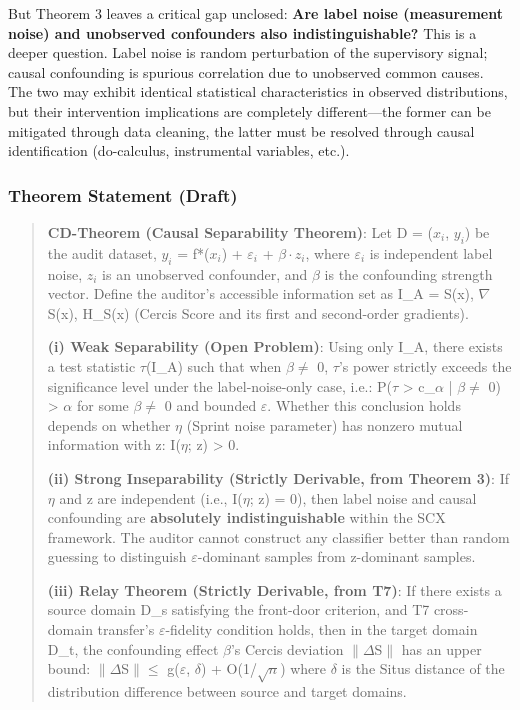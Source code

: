 \documentclass[
  12pt,
]{article}
\begin{document}
But Theorem 3 leaves a critical gap unclosed: \textbf{Are label noise (measurement noise) and unobserved confounders also indistinguishable?} This is a deeper question. Label noise is random perturbation of the supervisory signal; causal confounding is spurious correlation due to unobserved common causes. The two may exhibit identical statistical characteristics in observed distributions, but their intervention implications are completely different---the former can be mitigated through data cleaning, the latter must be resolved through causal identification (do-calculus, instrumental variables, etc.).

\subsubsection{Theorem Statement (Draft)}\label{cd-statement}

\begin{quote}
\textbf{CD-Theorem (Causal Separability Theorem)}: Let D = {($x_i$, $y_i$)} be the audit dataset, $y_i$ = f*($x_i$) + $\varepsilon_i$ + $\beta\cdot z_i$, where $\varepsilon_i$ is independent label noise, $z_i$ is an unobserved confounder, and $\beta$ is the confounding strength vector. Define the auditor's accessible information set as I\_A = {S(x), $\nabla$S(x), H\_S(x)} (Cercis Score and its first and second-order gradients).

\textbf{(i) Weak Separability (Open Problem)}: Using only I\_A, there exists a test statistic $\tau$(I\_A) such that when $\beta \neq$ 0, $\tau$'s power strictly exceeds the significance level under the label-noise-only case, i.e.: P($\tau$ > c\_$\alpha$ | $\beta \neq$ 0) > $\alpha$ for some $\beta \neq$ 0 and bounded $\varepsilon$. Whether this conclusion holds depends on whether $\eta$ (Sprint noise parameter) has nonzero mutual information with z: I($\eta$; z) > 0.

\textbf{(ii) Strong Inseparability (Strictly Derivable, from Theorem 3)}: If $\eta$ and z are independent (i.e., I($\eta$; z) = 0), then label noise and causal confounding are \textbf{absolutely indistinguishable} within the SCX framework. The auditor cannot construct any classifier better than random guessing to distinguish $\varepsilon$-dominant samples from z-dominant samples.

\textbf{(iii) Relay Theorem (Strictly Derivable, from T7)}: If there exists a source domain D\_s satisfying the front-door criterion, and T7 cross-domain transfer's $\varepsilon$-fidelity condition holds, then in the target domain D\_t, the confounding effect $\beta$'s Cercis deviation $\|\Delta$S$\|$ has an upper bound: $\|\Delta$S$\| \leq$ g($\varepsilon$, $\delta$) + O(1/$\sqrt{n}$) where $\delta$ is the Situs distance of the distribution difference between source and target domains.
\end{quote}
\end{document}
